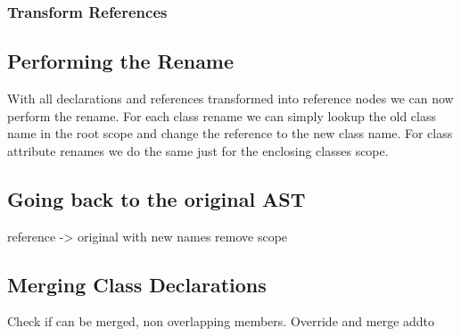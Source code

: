 \subsubsection{Transform References}

\subsection{Performing the Rename}\label{subsec:performing-the-rename}

With all declarations and references transformed into reference nodes we can now perform the rename.
For each class rename we can simply lookup the old class name in the root scope and change the reference to the new class name.
For class attribute renames we do the same just for the enclosing classes scope.

\subsection{Going back to the original AST}\label{subsec:going-back-to-the-original-ast}

reference -> original with new names
remove scope

\subsection{Merging Class Declarations}\label{subsec:merging-class-declarations}

Check if can be merged, non overlapping members.
Override and merge addto